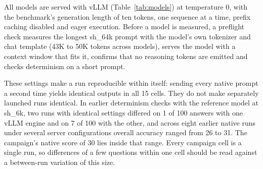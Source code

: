 \documentclass[journal=jcisd8,manuscript=article]{achemso}
\newcommand{\sub}[1]{\textsf{sh\_#1}}                    %
\begin{document}
\begin{table}[H]\centering
\caption{Answering models and serving configurations. Qwen3-4B-Instruct-2507 is the reference model used during development; the other four were added after all detector parameters were frozen. The KV-cache type differs between models by necessity (Section~\ref{sec:prereg}) and is fixed within each model across all arms.}
\label{tab:models}
\end{table}

All models are served with vLLM \cite{kwon2023vllm} (Table~\ref{tab:models}) at temperature 0, with the benchmark's generation length of ten tokens, one sequence at a time, prefix caching disabled and eager execution. Before a model is measured, a preflight check measures the longest \sub{64k} prompt with the model's own tokenizer and chat template (43K to 50K tokens across models), serves the model with a context window that fits it, confirms that no reasoning tokens are emitted and checks determinism on a short prompt.

These settings make a run reproducible within itself: sending every native prompt a second time yields identical outputs in all 15 cells. They do not make separately launched runs identical. In earlier determinism checks with the reference model at \sub{6k}, two runs with identical settings differed on 1 of 100 answers with one vLLM engine and on 7 of 100 with the other, and across eight earlier native runs under several server configurations overall accuracy ranged from 26 to 31. The campaign's native score of 30 lies inside that range. Every campaign cell is a single run, so differences of a few questions within one cell should be read against a between-run variation of this size.
\end{document}
